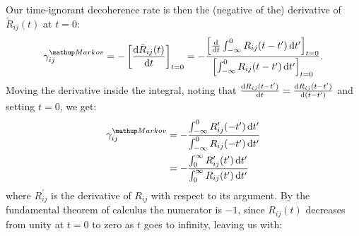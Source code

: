 Our time-ignorant decoherence rate is then the (negative of the) derivative of $\tilde R_{ij}(t)$ at $t=0$:
\begin{align}
\gamma_{ij}^\up{Markov} = -\left[\dv{\tilde R_{ij}(t)}{t}\right]_{t=0} = -\frac{\left[\dv{t}\int_{-\infty}^0 R_{ij}(t-t^\prime) \,\dd t^\prime\right]_{t=0} }
{\left[\int_{-\infty}^0 R_{ij}(t-t^\prime) \,\dd t^\prime\right]_{t=0}}.
\end{align}
Moving the derivative inside the integral, noting that $\dv{R_{ij}(t - t^\prime)}{t} = \dv{R_{ij}(t - t^\prime)}{(t - t^\prime)}$ and setting $t = 0$, we get:
\begin{align}
\gamma_{ij}^\up{Markov} &= -\frac
{\int_{-\infty}^0 R_{ij}^\prime(-t^\prime) \,\dd t^\prime}
{\int_{-\infty}^0 R_{ij}(-t^\prime) \,\dd t^\prime}\\
&= -\frac
{\int_0^\infty R_{ij}^\prime(t^\prime) \,\dd t^\prime}
{\int_0^\infty R_{ij}(t^\prime) \,\dd t^\prime}
\end{align}
where $R_{ij}^\prime$ is the derivative of $R_{ij}$ with respect to its argument. By the fundamental theorem of calculus the numerator is $-1$, since $R_{ij}(t)$ decreases from unity at $t=0$ to zero as $t$ goes to infinity, leaving us with:

